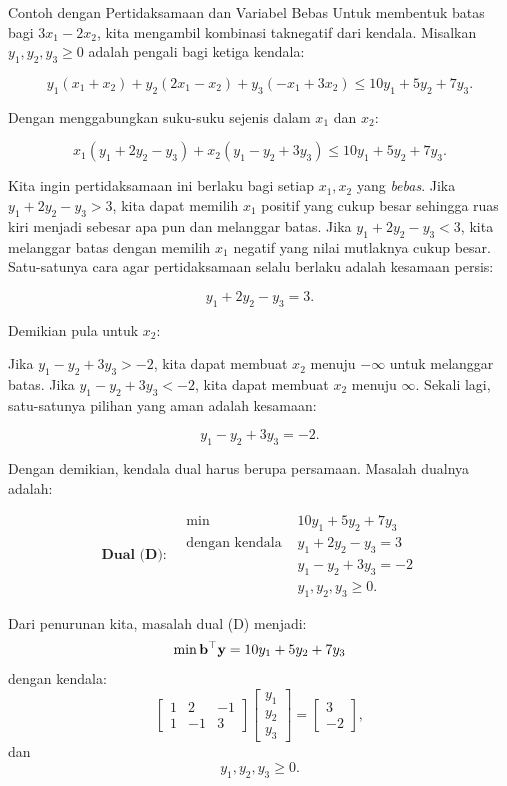 \begin{example}{Contoh dengan Pertidaksamaan dan Variabel Bebas}{}
Untuk membentuk batas bagi $3x_1 - 2x_2$, kita mengambil kombinasi taknegatif dari kendala. Misalkan $y_1, y_2, y_3 \geq 0$ adalah pengali bagi ketiga kendala:

\[
y_1(x_1 + x_2) + y_2(2x_1 - x_2) + y_3(-x_1 + 3x_2) \leq 10y_1 + 5y_2 + 7y_3.
\]

Dengan menggabungkan suku-suku sejenis dalam $x_1$ dan $x_2$:

\[
x_1(y_1 + 2y_2 - y_3) + x_2(y_1 - y_2 + 3y_3) \leq 10y_1 + 5y_2 + 7y_3.
\]

Kita ingin pertidaksamaan ini berlaku bagi setiap $x_1, x_2$ yang \emph{bebas}. Jika $y_1 + 2y_2 - y_3 > 3$, kita dapat memilih $x_1$ positif yang cukup besar sehingga ruas kiri menjadi sebesar apa pun dan melanggar batas. Jika $y_1 + 2y_2 - y_3 < 3$, kita melanggar batas dengan memilih $x_1$ negatif yang nilai mutlaknya cukup besar. Satu-satunya cara agar pertidaksamaan selalu berlaku adalah kesamaan persis:

\[
y_1 + 2y_2 - y_3 = 3.
\]

Demikian pula untuk $x_2$:

Jika $y_1 - y_2 + 3y_3 > -2$, kita dapat membuat $x_2$ menuju $-\infty$ untuk melanggar batas. Jika $y_1 - y_2 + 3y_3 < -2$, kita dapat membuat $x_2$ menuju $\infty$. Sekali lagi, satu-satunya pilihan yang aman adalah kesamaan:

\[
y_1 - y_2 + 3y_3 = -2.
\]

Dengan demikian, kendala dual harus berupa persamaan. Masalah dualnya adalah:

\[
\textbf{Dual (D):} \quad
\begin{aligned}
\min \; & 10y_1 + 5y_2 + 7y_3 \\
\text{dengan kendala } & y_1 + 2y_2 - y_3 = 3 \\
& y_1 - y_2 + 3y_3 = -2 \\
& y_1, y_2, y_3 \geq 0.
\end{aligned}
\]

Dari penurunan kita, masalah dual (D) menjadi:
\[
\min \mathbf{b}^\top \mathbf{y} = 10y_1 + 5y_2 + 7y_3
\]
dengan kendala:
\[
\begin{bmatrix}
1 & 2 & -1 \\
1 & -1 & 3
\end{bmatrix}
\begin{bmatrix}
y_1 \\ y_2 \\ y_3
\end{bmatrix}
=
\begin{bmatrix}
3 \\ -2
\end{bmatrix},
\]
dan
\[
y_1, y_2, y_3 \geq 0.
\]


\end{example}
